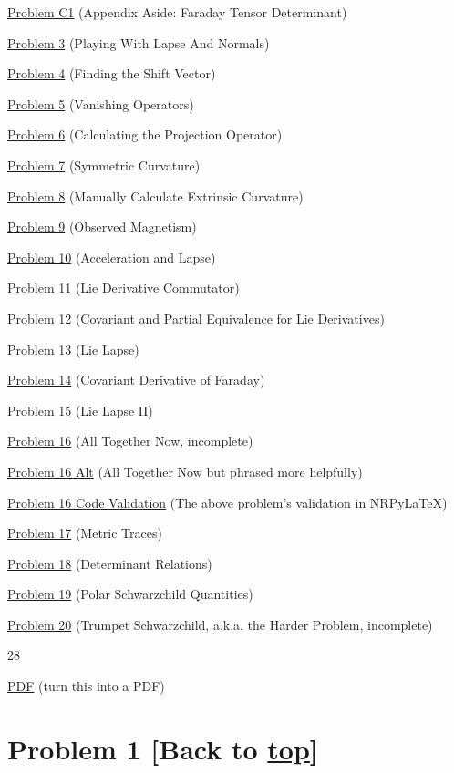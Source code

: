 \documentclass[landscape,letterpaper,10pt,english]{article}
\begin{document}
\hyperref[c1]{Problem C1} (Appendix Aside: Faraday Tensor Determinant)

\hyperref[p3]{Problem 3} (Playing With Lapse And Normals)

\hyperref[p4]{Problem 4} (Finding the Shift Vector)

\hyperref[p5]{Problem 5} (Vanishing Operators)

\hyperref[p6]{Problem 6} (Calculating the Projection Operator)

\hyperref[p7]{Problem 7} (Symmetric Curvature)

\hyperref[p8]{Problem 8} (Manually Calculate Extrinsic Curvature)

\hyperref[p9]{Problem 9} (Observed Magnetism)

\hyperref[p10]{Problem 10} (Acceleration and Lapse)

\hyperref[p11]{Problem 11} (Lie Derivative Commutator)

\hyperref[p12]{Problem 12} (Covariant and Partial Equivalence for Lie
Derivatives)

\hyperref[p13]{Problem 13} (Lie Lapse)

\hyperref[p14]{Problem 14} (Covariant Derivative of Faraday)

\hyperref[p15]{Problem 15} (Lie Lapse II)

\hyperref[p16]{Problem 16} (All Together Now, incomplete)

\hyperref[p16a]{Problem 16 Alt} (All Together Now but phrased more
helpfully)

\hyperref[p16c]{Problem 16 Code Validation} (The above problem's
validation in NRPyLaTeX)

\hyperref[p17]{Problem 17} (Metric Traces)

\hyperref[p18]{Problem 18} (Determinant Relations)

\hyperref[p19]{Problem 19} (Polar Schwarzchild Quantities)

\hyperref[p20]{Problem 20} (Trumpet Schwarzchild, a.k.a. the Harder
Problem, incomplete)

28

\hyperref[latex_pdf_output]{PDF} (turn this into a PDF)

    \hypertarget{problem-1-back-to-top}{%
\section{\texorpdfstring{Problem 1 {[}Back to
\hyperref[toc]{top}{]}}{Problem 1 {[}Back to {]}}}\label{problem-1-back-to-top}}
\end{document}
